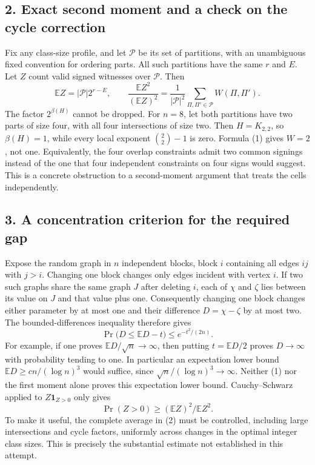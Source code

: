 \subsection*{2. Exact second moment and a check on the cycle correction}
Fix any class-size profile, and let $\mathcal P$ be its set of partitions, with an unambiguous fixed convention for ordering parts. All such partitions have the same $r$ and $E$. Let $Z$ count valid signed witnesses over $\mathcal P$. Then
\[
 \mathbb EZ=|\mathcal P|2^{r-E},\qquad
 \frac{\mathbb EZ^2}{(\mathbb EZ)^2}
 =\frac1{|\mathcal P|^2}\sum_{\Pi,\Pi'\in\mathcal P}W(\Pi,\Pi').
 \tag{2}
\]
The factor $2^{\beta(H)}$ cannot be dropped. For $n=8$, let both partitions have two parts of size four, with all four intersections of size two. Then $H=K_{2,2}$, so $\beta(H)=1$, while every local exponent $\binom22-1$ is zero. Formula (1) gives $W=2$, not one. Equivalently, the four overlap constraints admit two common signings instead of the one that four independent constraints on four signs would suggest.
This is a concrete obstruction to a second-moment argument that treats the cells independently.

\subsection*{3. A concentration criterion for the required gap}
Expose the random graph in $n$ independent blocks, block $i$ containing all edges $ij$ with $j>i$. Changing one block changes only edges incident with vertex $i$. If two such graphs share the same graph $J$ after deleting $i$, each of $\chi$ and $\zeta$ lies between its value on $J$ and that value plus one. Consequently changing one block changes either parameter by at most one and their difference
$D=\chi-\zeta$ by at most two.
The bounded-differences inequality therefore gives
\[
 \Pr\bigl(D\le\mathbb ED-t\bigr)\le e^{-t^2/(2n)}.
 \tag{3}
\]
For example, if one proves $\mathbb ED/\sqrt n\to\infty$, then putting $t=\mathbb ED/2$ proves $D\to\infty$ with probability tending to one. In particular an expectation lower bound $\mathbb ED\ge c n/(\log n)^3$ would suffice, since $\sqrt n/(\log n)^3\to\infty$.
Neither (1) nor the first moment alone proves this expectation lower bound. Cauchy--Schwarz applied to $Z\mathbf1_{Z>0}$ only gives
\[
 \Pr(Z>0)\ge (\mathbb EZ)^2/\mathbb EZ^2.
\]
To make it useful, the complete average in (2) must be controlled, including large intersections and cycle factors, uniformly across changes in the optimal integer class sizes. This is precisely the substantial estimate not established in this attempt.

